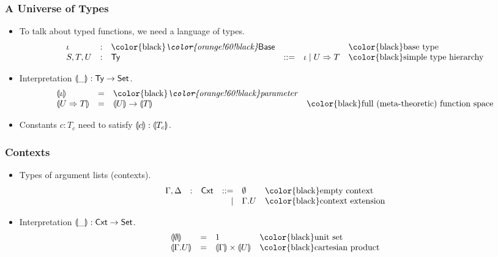 \documentclass[t,fleqn,usenames,dvipsnames]{beamer}
\newcommand{\mybox}[1]{\mbox{\color{black}#1}}
\renewcommand{\Set}{\mathsf{Set}}
\newcommand{\cAnn}{\color{red!80!black}}%
\renewcommand{\emph}[1]{{\cAnn#1}}
\newcommand{\cType}{\color{orange!60!black}}
\renewcommand{\emph}[1]{\textit{\cType#1}}
\begin{document}
\begin{frame}%
  \frametitle{A Universe of Types}
  \vspace{-3ex}
  \begin{itemize}
  \item To talk about typed functions, we need a language of types.
\[
\begin{array}{lllrll}
  \iota & : & \mybox{\emph{$\Base$}} & & &  \mybox{base type} \\
  S,T,U & : & \Ty & ::= & \iota \mid U \To T & \mybox{simple type hierarchy} \\
\end{array}
\]
  \vspace{-2ex}
  \item Interpretation $\denty\_ : \Ty \to \Set$.
\[
\begin{array}{llll}
  \denty{\iota}   & = & \mybox{\emph{parameter}} \\
  \denty{U \To T} & = & \denty U \to \denty T
    & \mybox{full (meta-theoretic) function space}
\end{array}
\]
  \vspace{-2ex}
  \item Constants $c : T_c$ need to satisfy $\llparenthesis c\rrparenthesis : \llparenthesis T_c\rrparenthesis$.
  \end{itemize}
\end{frame}


\begin{frame}%
  \frametitle{Contexts}
  \vspace{-3ex}
  \begin{itemize}
  \item Types of argument lists (contexts).
\[
\begin{array}{lllrll}
  \Gamma,\Delta & : & \Cxt & ::= & \cempty & \mybox{empty context}
\\ &&& \mid & \Gamma.U & \mybox{context extension}
\end{array}
\]
  \vspace{-2ex}
  \item Interpretation $\denty\_ : \Cxt \to \Set$.
\[
\begin{array}{llll}
  \denty{\cempty} & = & 1
    & \mybox{unit set}
\\
  \denty{\Gamma.U} & = & \denty \Gamma \times \denty U
    & \mybox{cartesian product}
\end{array}
\]
  \end{itemize}
\end{frame}
\end{document}
